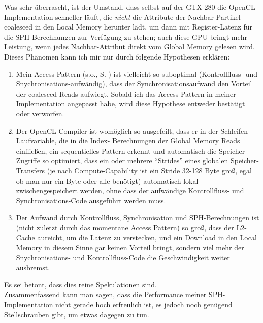 	Was sehr überrascht, ist der Umstand, dass selbst auf der GTX 280 die OpenCL-Implementation schneller läuft, die 
	\emph{nicht} die Attribute der Nachbar-Partikel coalesced in den Local Memory herunter lädt, um dann 
	mit Register-Latenz für die SPH-Berechnungen zur Verfügung zu stehen; auch diese GPU
	bringt mehr Leistung, wenn jedes Nachbar-Attribut direkt vom Global Memory gelesen wird.
	Dieses Phänomen kann ich mir nur durch folgende Hypothesen erklären:
	\begin{enumerate}
		\item Mein Access Pattern (s.o., S. \pageref{enum:goswamiAccessPattern}) ist vielleicht so suboptimal
		(Kontrollfluss- und Snychronisations-aufwändig), dass
		der Synchronisationsaufwand den Vorteil der coalesced Reads aufwiegt. 
		Sobald ich das Access Pattern in meiner Implementation angepasst habe, wird diese Hypothese
		entweder bestätigt oder verworfen.
		\item Der OpenCL-Compiler ist womöglich so ausgefeilt, dass er in der Schleifen-Laufvariable, die in die Index-
		Berechnungen der Global Memory Reads einfließen, ein sequentielles Pattern erkennt und automatisch
		die Speicher-Zugriffe so optimiert, dass ein oder mehrere "`Strides"' eines globalen Speicher-Transfers
		(je nach Compute-Capability ist ein Stride 32-128 Byte groß, egal ob man nur ein Byte oder alle benötigt) 
		automatisch lokal zwischengespeichert werden, ohne dass der aufwändige Kontrollfluss- und Synchronisations-Code 
		ausgeführt werden muss.
		\item Der Aufwand durch Kontrollfluss, Synchronisation und SPH-Berechnungen ist 
		(nicht zuletzt durch das momentane Access Pattern) so
		groß, dass der L2-Cache aureicht, um die Latenz zu verstecken, und ein Download in den Local Memory
		in diesem Sinne	gar keinen Vorteil bringt, sondern viel mehr der Snychronisations- und Kontrollfluss-Code
		die Geschwindigkeit weiter ausbremst.
	\end{enumerate}
	Es sei betont, dass dies reine Spekulationen sind.\\
	
	


	
	
	Zusammenfassend kann man sagen, dass die Performance meiner SPH-Implementation nicht gerade hoch erfreulich ist, 
	es jedoch noch genügend Stellschrauben gibt, um etwas dagegen zu tun.\\
	
